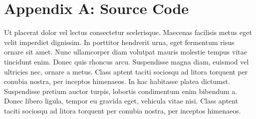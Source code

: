 \documentclass{sydeStyle}
\begin{document}
\section*{Appendix A: Source Code}
Ut placerat dolor vel lectus consectetur scelerisque. Maecenas facilisis
metus eget velit imperdiet dignissim. In porttitor hendrerit urna, eget
fermentum risus ornare sit amet. Nunc ullamcorper diam volutpat mauris
molestie tempus vitae tincidunt enim. Donec quis rhoncus arcu. Suspendisse
magna diam, euismod vel ultricies nec, ornare a metus. Class aptent taciti
sociosqu ad litora torquent per conubia nostra, per inceptos himenaeos. In
hac habitasse platea dictumst. Suspendisse pretium auctor turpis, lobortis
condimentum enim bibendum a. Donec libero ligula, tempor eu gravida eget,
vehicula vitae nisi. Class aptent taciti sociosqu ad litora torquent per
conubia nostra, per inceptos himenaeos.
\end{document}
